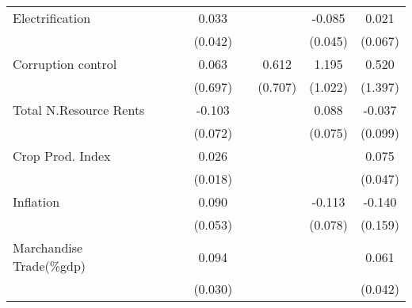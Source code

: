 \begin{table}[H]
\begin{adjustbox}{max width=\textwidth}
\begin{tabular}{l*{7}{c}}
\addlinespace
Electrification&                     &                     &       0.033         &                     &                     &      -0.085\sym{*}  &       0.021         \\
            &                     &                     &     (0.042)         &                     &                     &     (0.045)         &     (0.067)         \\
\addlinespace
Corruption control&                     &                     &       0.063         &                     &       0.612         &       1.195         &       0.520         \\
            &                     &                     &     (0.697)         &                     &     (0.707)         &     (1.022)         &     (1.397)         \\
\addlinespace
Total N.Resource Rents&                     &                     &      -0.103         &                     &                     &       0.088         &      -0.037         \\
            &                     &                     &     (0.072)         &                     &                     &     (0.075)         &     (0.099)         \\
\addlinespace
Crop Prod. Index&                     &                     &       0.026         &                     &                     &                     &       0.075         \\
            &                     &                     &     (0.018)         &                     &                     &                     &     (0.047)         \\
\addlinespace
Inflation   &                     &                     &       0.090\sym{*}  &                     &                     &      -0.113         &      -0.140         \\
            &                     &                     &     (0.053)         &                     &                     &     (0.078)         &     (0.159)         \\
\addlinespace
Marchandise Trade(\%gdp)&                     &                     &       0.094\sym{***}&                     &                     &                     &       0.061         \\
            &                     &                     &     (0.030)         &                     &                     &                     &     (0.042)         \\

\end{tabular}
\end{adjustbox}
\end{table}
